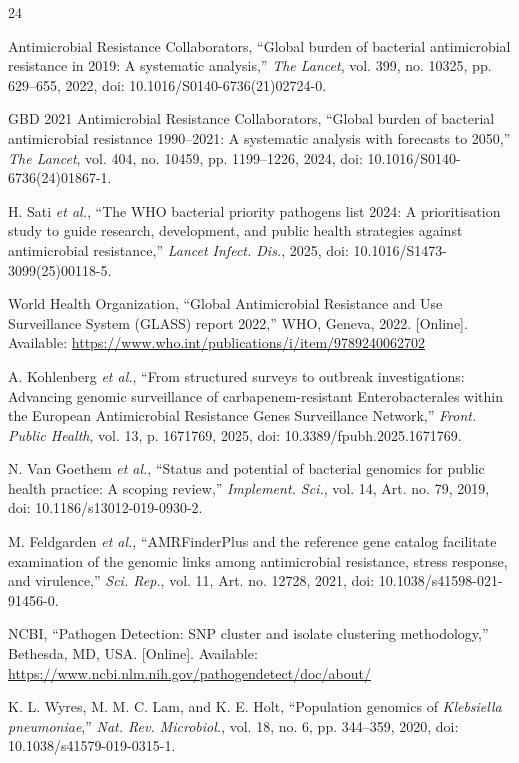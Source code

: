 \documentclass[journal]{IEEEtran}
\begin{document}
{\scriptsize
\begin{thebibliography}{24}
\setlength{\itemsep}{0pt}

Antimicrobial Resistance Collaborators, ``Global burden of bacterial antimicrobial resistance in 2019: A systematic analysis,'' \textit{The Lancet}, vol. 399, no. 10325, pp. 629--655, 2022, doi: 10.1016/S0140-6736(21)02724-0.

GBD 2021 Antimicrobial Resistance Collaborators, ``Global burden of bacterial antimicrobial resistance 1990--2021: A systematic analysis with forecasts to 2050,'' \textit{The Lancet}, vol. 404, no. 10459, pp. 1199--1226, 2024, doi: 10.1016/S0140-6736(24)01867-1.

H. Sati \textit{et al.}, ``The WHO bacterial priority pathogens list 2024: A prioritisation study to guide research, development, and public health strategies against antimicrobial resistance,'' \textit{Lancet Infect. Dis.}, 2025, doi: 10.1016/S1473-3099(25)00118-5.

World Health Organization, ``Global Antimicrobial Resistance and Use Surveillance System (GLASS) report 2022,'' WHO, Geneva, 2022. [Online]. Available: \url{https://www.who.int/publications/i/item/9789240062702}

A. Kohlenberg \textit{et al.}, ``From structured surveys to outbreak investigations: Advancing genomic surveillance of carbapenem-resistant Enterobacterales within the European Antimicrobial Resistance Genes Surveillance Network,'' \textit{Front. Public Health}, vol. 13, p. 1671769, 2025, doi: 10.3389/fpubh.2025.1671769.

N. Van Goethem \textit{et al.}, ``Status and potential of bacterial genomics for public health practice: A scoping review,'' \textit{Implement. Sci.}, vol. 14, Art. no. 79, 2019, doi: 10.1186/s13012-019-0930-2.

M. Feldgarden \textit{et al.}, ``AMRFinderPlus and the reference gene catalog facilitate examination of the genomic links among antimicrobial resistance, stress response, and virulence,'' \textit{Sci. Rep.}, vol. 11, Art. no. 12728, 2021, doi: 10.1038/s41598-021-91456-0.

NCBI, ``Pathogen Detection: SNP cluster and isolate clustering methodology,'' Bethesda, MD, USA. [Online]. Available: \url{https://www.ncbi.nlm.nih.gov/pathogendetect/doc/about/}

K. L. Wyres, M. M. C. Lam, and K. E. Holt, ``Population genomics of \textit{Klebsiella pneumoniae},'' \textit{Nat. Rev. Microbiol.}, vol. 18, no. 6, pp. 344--359, 2020, doi: 10.1038/s41579-019-0315-1.


\end{thebibliography}}
\end{document}
